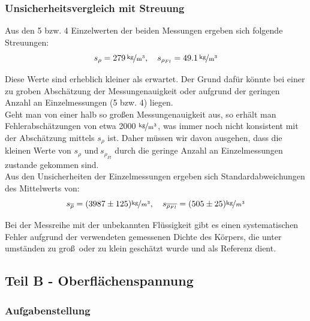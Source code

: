 \documentclass[11pt,a4paper]{article}
\begin{document}
\subsubsection{Unsicherheitsvergleich mit Streuung}

Aus den 5 bzw. 4 Einzelwerten der beiden Messungen ergeben sich folgende Streuungen:\\

$$s_\rho=279\, \mathrm{\nicefrac{\textrm{kg}}{m^3}},\quad s_{\rho_{Fl}}=49.1\, \mathrm{\nicefrac{\textrm{kg}}{m^3}}$$

Diese Werte sind erheblich kleiner als erwartet. Der Grund daf\"ur k\"onnte bei einer zu groben Absch\"atzung der Messungenauigkeit oder aufgrund der geringen Anzahl an Einzelmessungen (5 bzw. 4) liegen.\\

Geht man von einer halb so gro\ss en Messungenauigkeit aus, so erh\"alt man Fehlerabsch\"atzungen von etwa 2000 $\mathrm{\nicefrac{\textrm{kg}}{m^3}}$, was immer noch nicht konsistent mit der Absch\"atzung mittels $s_\rho$ ist. Daher m\"ussen wir davon ausgehen, dass die kleinen Werte von $s_\rho\textrm{ und}\ s_{\rho_{Fl}}$ durch die geringe Anzahl an Einzelmessungen zustande gekommen sind.\\

Aus den Unsicherheiten der Einzelmessungen ergeben sich Standardabweichungen des Mittelwerts von:\\
\[
s_{\overline{\rho}}=(3987\pm125)\nicefrac{\textrm{kg}}{m^3},\quad
s_{\overline{\rho_{Fl}}}=(505\pm25)\nicefrac{\textrm{kg}}{m^3}
\]

Bei der Messreihe mit der unbekannten Fl\"ussigkeit gibt es einen systematischen Fehler aufgrund der verwendeten gemessenen Dichte des K\"orpers, die unter umst\"anden zu gro\ss\ oder zu klein gesch\"atzt wurde und als Referenz dient.
\pagebreak
\subsection{Teil B - Oberfl\"achenspannung}
\subsubsection{Aufgabenstellung}
\end{document}
